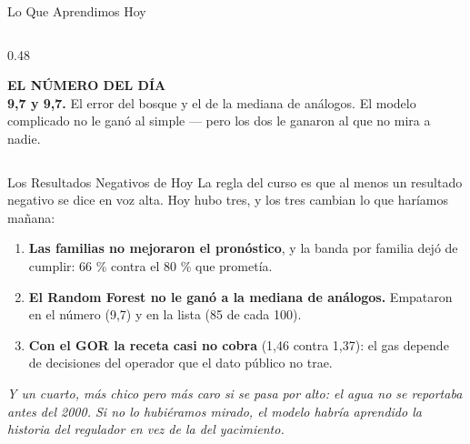 \documentclass[aspectratio=169, 11pt]{beamer}
\begin{document}
\begin{frame}[shrink=8]{Lo Que Aprendimos Hoy}
\begin{columns}[T]
\begin{column}{0.48\textwidth}
      \vspace{5pt}
      \begin{tcolorbox}[colback=arcaGray, colframe=arcaRed, boxrule=0pt, leftrule=3pt,
        arc=3pt, left=6pt, right=6pt, top=4pt, bottom=4pt]
        {\scriptsize\color{arcaRed}\bfseries EL NÚMERO DEL DÍA}\\[3pt]
        {\scriptsize\color{textMuted}
         \textbf{9,7 y 9,7.} El error del bosque y el de la mediana de
         análogos. El modelo complicado no le ganó al simple --- pero los dos
         le ganaron al que no mira a nadie.}
      \end{tcolorbox}
    \end{column}
  \end{columns}
\end{frame}

\begin{frame}[shrink=8]{Los Resultados Negativos de Hoy}
  \vspace{4pt}
  {\footnotesize\color{textMuted}
   La regla del curso es que al menos un resultado negativo se dice en voz
   alta. Hoy hubo tres, y los tres cambian lo que haríamos mañana:}
  \vspace{7pt}
  {\footnotesize\color{textMuted}
  \begin{enumerate}\setlength{\itemsep}{7pt}
    \item[{\color{arcaRed}\scriptsize\faTimes}]
      \textbf{Las familias no mejoraron el pronóstico}, y la banda por familia
      dejó de cumplir: 66 \% contra el 80 \% que prometía.
    \item[{\color{arcaRed}\scriptsize\faTimes}]
      \textbf{El Random Forest no le ganó a la mediana de análogos.} Empataron
      en el número (9,7) y en la lista (85 de cada 100).
    \item[{\color{arcaRed}\scriptsize\faTimes}]
      \textbf{Con el GOR la receta casi no cobra} (1,46 contra 1,37): el gas
      depende de decisiones del operador que el dato público no trae.
  \end{enumerate}}
  \vspace{8pt}
  {\footnotesize\color{arcaDark}\itshape
   Y un cuarto, más chico pero más caro si se pasa por alto: el agua no se
   reportaba antes del 2000. Si no lo hubiéramos mirado, el modelo habría
   aprendido la historia del regulador en vez de la del yacimiento.}
\end{frame}
\end{document}
